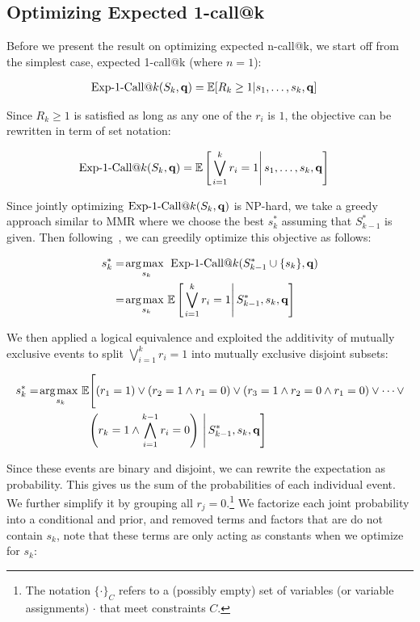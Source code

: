 \subsection{Optimizing Expected 1-call@k}
Before we present the result on optimizing expected n-call@k, we start off from the simplest case, expected 1-call@k (where $n=1$):

\begin{align}
    \ExpOneCall(S_k,\vec{q}) & = \mathbb{E}[R_k\geq 1|s_1,\dots,s_k,\vec{q}]
\end{align}

Since $R_k\geq 1$ is satisfied as long as any one of the $r_i$ is $1$, the objective can be rewritten in term of set notation:

\begin{align}
\label{eq:setRelevance}
    \ExpOneCall(S_k,\vec{q}) & = \mathbb{E} \left[\left. \bigvee_{i=1}^{k}r_i=1 \right| s_{1},\dots, s_{k},\vec{q} \right]
\end{align}

Since jointly optimizing $\ExpOneCall(S_k,\vec{q})$ is NP-hard, we
take a greedy approach similar to MMR where we choose the best $s_k^*$
assuming that $S_{k-1}^*$ is given.  Then following~\cite{chen06Less},
we can greedily optimize this objective as 
follows:

\begin{align}
s_k^* & = \argmax_{s_k} \; \ExpOneCall(S_{k-1}^* \cup \{ s_k \},\vec{q}) \nonumber \\
   & = \argmax_{s_k} \mathbb{E}\left[\left. \bigvee_{i=1}^{k} r_i=1 \right| S_{k-1}^*, s_{k},\vec{q}\right] \nonumber \\
\end{align}

We then applied a logical equivalence and exploited the additivity of
mutually exclusive events to split $\bigvee_{i=1}^{k} r_i=1$ into mutually exclusive
disjoint subsets:

\begin{align}
s_k^* & = \argmax_{s_k} \mathbb{E}\Bigg[  (r_1=1) \vee (r_2 =1 \wedge r_1=0) \vee (r_3 =1 \wedge r_2=0 \wedge r_1=0) \vee \cdots \vee \nonumber \\
   & \hspace{19mm} \left(r_k=1 \wedge \bigwedge_{i=1}^{k-1} r_i=0 \right) \, \Bigg| \, S_{k-1}^*,s_k,\vec{q} \Bigg] \label{eq:logicalsplit}
\end{align}

Since these events are binary and disjoint, we can rewrite the expectation as probability.
This gives us the sum of the probabilities of each individual event.
We further simplify it by grouping all $r_j = 0$.\footnote{The notation 
$\{ \cdot \}_C$ refers to a (possibly empty) set of 
variables (or variable assignments) $\cdot$ that meet constraints $C$.}
We factorize each joint probability into a conditional and prior, and removed terms and factors that are do not contain $s_k$, note that these terms are only acting as constants when we optimize for $s_k$:

